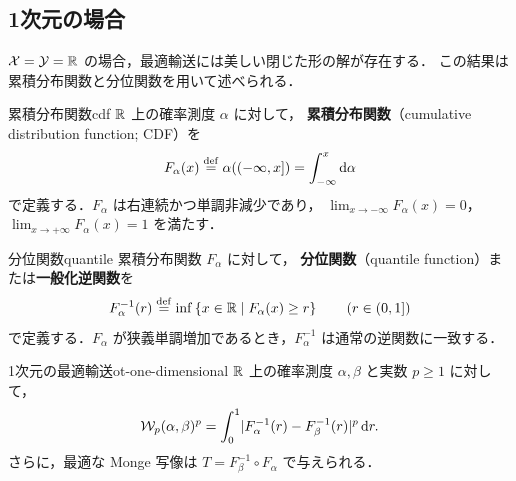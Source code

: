 \subsection{1次元の場合}
\label{subsec:one-dimensional}

$\mathcal{X} = \mathcal{Y} = \mathbb{R}$ の場合，最適輸送には美しい閉じた形の解が存在する．
この結果は累積分布関数と分位関数を用いて述べられる．

\begin{definition}{累積分布関数}{cdf}
  $\mathbb{R}$ 上の確率測度 $\alpha$ に対して，
  \textbf{累積分布関数}（cumulative distribution function; CDF）を
  \[
    F_\alpha(x) \overset{\mathrm{def}}{=} \alpha((-\infty, x]) = \int_{-\infty}^x \mathrm{d}\alpha
  \]
  で定義する．$F_\alpha$ は右連続かつ単調非減少であり，
  $\lim_{x \to -\infty} F_\alpha(x) = 0$，$\lim_{x \to +\infty} F_\alpha(x) = 1$ を満たす．
\end{definition}

\begin{definition}{分位関数}{quantile}
  累積分布関数 $F_\alpha$ に対して，
  \textbf{分位関数}（quantile function）または\textbf{一般化逆関数}を
  \[
    F_\alpha^{-1}(r) \overset{\mathrm{def}}{=} \inf \left\{ x \in \mathbb{R} \;\middle|\; F_\alpha(x) \geq r \right\}
    \qquad (r \in (0, 1])
  \]
  で定義する．$F_\alpha$ が狭義単調増加であるとき，$F_\alpha^{-1}$ は通常の逆関数に一致する．
\end{definition}

\begin{theorem}{1次元の最適輸送}{ot-one-dimensional}
  $\mathbb{R}$ 上の確率測度 $\alpha, \beta$ と実数 $p \geq 1$ に対して，
  \[
    \mathcal{W}_p(\alpha, \beta)^p
    = \int_0^1 \lvert F_\alpha^{-1}(r) - F_\beta^{-1}(r) \rvert^p \, \mathrm{d} r.
  \]
  さらに，最適な Monge 写像は $T = F_\beta^{-1} \circ F_\alpha$ で与えられる．
\end{theorem}

